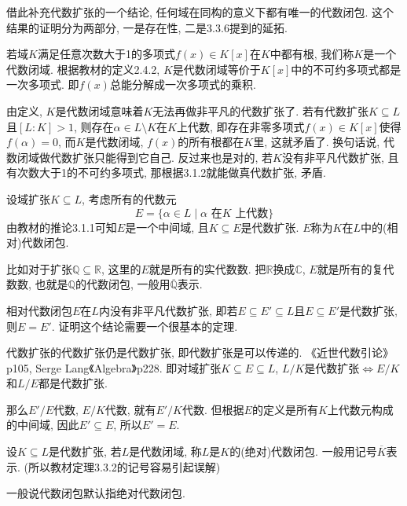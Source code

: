 \documentclass{../solutions-cn}
\begin{document}
\begin{remark}
    借此补充代数扩张的一个结论, 任何域在同构的意义下都有唯一的代数闭包. 这个结果的证明分为两部分, 一是存在性, 二是3.3.6提到的延拓.

    \begin{defstar}
        若域$K$满足任意次数大于1的多项式$f(x) \in K[x]$在$K$中都有根, 我们称$K$是一个代数闭域. 根据教材的定义2.4.2, $K$是代数闭域等价于$K[x]$中的不可约多项式都是一次多项式. 即$f(x)$总能分解成一次多项式的乘积.
    \end{defstar}
    由定义, $K$是代数闭域意味着$K$无法再做非平凡的代数扩张了. 若有代数扩张$K \subseteq L$且$[L:K] > 1$, 则存在$\alpha \in L \setminus K$在$K$上代数, 即存在非零多项式$f(x) \in K[x]$使得$f(\alpha) = 0$, 而$K$是代数闭域, $f(x)$的所有根都在$K$里, 这就矛盾了. 换句话说, 代数闭域做代数扩张只能得到它自己. 反过来也是对的, 若$K$没有非平凡代数扩张, 且有次数大于1的不可约多项式, 那根据3.1.2就能做真代数扩张, 矛盾.

    \begin{defstar}
        设域扩张$K \subseteq L$, 考虑所有的代数元
        \[
            E = \{\alpha \in L \mid \alpha \text{ 在}K \text{ 上代数}\}
        \]
        由教材的推论3.1.1可知$E$是一个中间域, 且$K \subseteq E$是代数扩张. $E$称为$K$在$L$中的(相对)代数闭包.
    \end{defstar}
    比如对于扩张$\mathbb{Q} \subseteq \mathbb{R}$, 这里的$E$就是所有的实代数数. 把$\mathbb{R}$换成$\mathbb{C}$, $E$就是所有的复代数数, 也就是$\mathbb{Q}$的代数闭包, 一般用$\overline{\mathbb{Q}}$表示.

    相对代数闭包$E$在$L$内没有非平凡代数扩张, 即若$E \subseteq E' \subseteq L$且$E \subseteq E'$是代数扩张, 则$E = E'$. 证明这个结论需要一个很基本的定理.

    \begin{thmstar}
        代数扩张的代数扩张仍是代数扩张, 即代数扩张是可以传递的. 《近世代数引论》p105, Serge Lang《Algebra》p228. 即对域扩张$K \subseteq E \subseteq L$, $L/K$是代数扩张$\iff E/K$和$L/E$都是代数扩张.
    \end{thmstar}

    那么$E'/E$代数, $E/K$代数, 就有$E'/K$代数. 但根据$E$的定义是所有$K$上代数元构成的中间域, 因此$E' \subseteq E$, 所以$E' = E$.

    \begin{defstar}
        设$K \subseteq L$是代数扩张, 若$L$是代数闭域, 称$L$是$K$的(绝对)代数闭包. 一般用记号$\overline{K}$表示. (所以教材定理3.3.2的记号容易引起误解)
    \end{defstar}
    一般说代数闭包默认指绝对代数闭包.


\end{remark}
\end{document}
